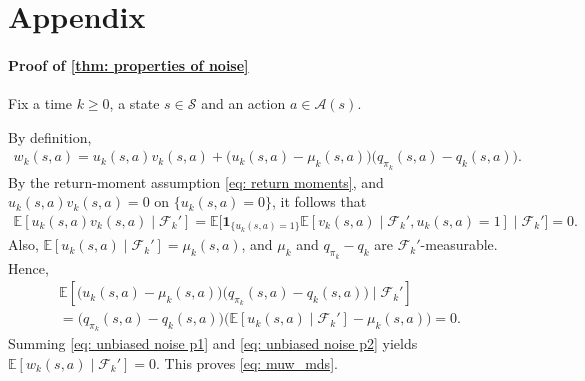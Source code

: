 \section*{Appendix}
\label{sec: Appendix}

\paragraph{Proof of \autoref{thm: properties of noise}}

Fix a time $k\ge 0$, a state $s \in \mathcal S$ and an action $a \in \mathcal A(s)$.

By definition,
\begin{align}
\label{eq: noise def in appendix proof}
w_k(s,a) = u_k(s,a) v_k(s,a) + \big( u_k(s,a)-\mu_k(s,a) \big) \big( q_{\pi_k}(s,a) - q_k(s,a) \big).
\end{align}
By the return-moment assumption \eqref{eq: return moments}, 
and $u_k(s,a) v_k(s,a) = 0$ on $\{u_k(s,a)=0\}$,
it follows that
\begin{align}
\label{eq: unbiased noise p1}
\mathbb E[ u_k(s,a) v_k(s,a) \mid \mathcal F_k']
=
\mathbb E \big[ 
    \mathbf 1_{\{u_k(s,a)=1\}} \mathbb E[ v_{k}(s,a) \mid \mathcal F_k', u_k(s,a)=1] 
    \mid \mathcal F_k' \big]
= 0 .
\end{align}
Also, $\mathbb E[u_k(s,a) \mid \mathcal F_k'] = \mu_k(s,a)$, and $\mu_k$ and $q_{\pi_k}-q_k$ are $\mathcal F_k'$-measurable. Hence,
\begin{multline}
\label{eq: unbiased noise p2}
\mathbb E \!\left[
\bigl( u_k(s,a)-\mu_k(s,a) \bigr) \bigl( q_{\pi_k}(s,a)-q_k(s,a) \bigr)
\mid \mathcal F_k'
\right]
\\
=
\big( q_{\pi_k}(s,a)-q_k(s,a) \big) 
\big( \mathbb E\!\left[ u_k(s,a) \mid \mathcal F_k'
\right]
-\mu_k(s,a) \big)
=
0 .
\end{multline}
Summing \eqref{eq: unbiased noise p1} and \eqref{eq: unbiased noise p2} yields $\mathbb E[w_k(s,a) \mid \mathcal F_k'] = 0$.
This proves \eqref{eq: muw_mds}.

